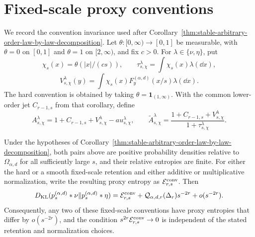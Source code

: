 \section{Fixed-scale proxy conventions}\label{app:stable-proxy-conventions}

We record the convention invariance used after
Corollary~\ref{thm:stable-arbitrary-order-law-by-law-decomposition}.  Let
\(\theta:[0,\infty)\to[0,1]\) be measurable, with \(\theta=0\) on
\([0,1]\) and \(\theta=1\) on \([2,\infty)\), and fix \(c>0\).  For
\(\lambda\in\{\nu,\eta\}\), put
\[
 \chi_s(x)=\theta(|x|/(cs)),\qquad
 \tau_{s,\chi}^\lambda=\int\chi_s(x)\lambda(\dd x),
\]
\[
 V_{s,\chi}^\lambda(y)
 =\int\chi_s(x)F_y^{(\alpha,d)}(x/s)\lambda(\dd x).
\]
The hard convention is obtained by taking
\(\theta=\mathbf1_{(1,\infty)}\).  With the common lower-order jet
\(C_{r-1,s}\) from that corollary, define
\[
 A_{s,\chi}^\lambda
 =1+C_{r-1,s}+V_{s,\chi}^\lambda-	au_{s,\chi}^\lambda,
 \qquad
 \widetilde A_{s,\chi}^\lambda
 =\frac{1+C_{r-1,s}+V_{s,\chi}^\lambda}
        {1+\tau_{s,\chi}^\lambda}.
\]

\begin{proposition}
\label{prop:stable-proxy-convention-robustness}
Under the hypotheses of
Corollary~\ref{thm:stable-arbitrary-order-law-by-law-decomposition}, both
pairs above are positive probability densities relative to
\(\Omega_{\alpha,d}\) for all sufficiently large \(s\), and their relative
entropies are finite.  For either the hard or a smooth fixed-scale retention
and either additive or multiplicative normalization, write the resulting
proxy entropy as \(\mathcal E_{r,s}^{\rm conv}\).  Then
\[
 D_{\rm KL}(p_s^{(\alpha,d)}*\nu\|p_s^{(\alpha,d)}*\eta)
 =\mathcal E_{r,s}^{\rm conv}
  +\mathcal Q_{\alpha,d,r}(\Delta_r)s^{-2r}+o(s^{-2r}).
\]
Consequently, any two of these fixed-scale conventions have proxy entropies
that differ by \(o(s^{-2r})\), and the condition
\(s^{2r}\mathcal E_{r,s}^{\rm conv}\to0\) is independent of the stated
retention and normalization choices.
\end{proposition}

